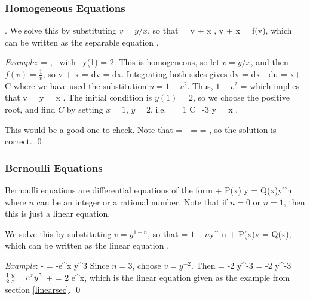 \documentclass[12pt]{book}
\begin{document}
\subsubsection{Homogeneous Equations}
\be
{}.
\ee
We solve this by substituting $v=y/x$, so that
\bee
{} = v + x ,
\quad \implies \quad
v + x  = f(v),
\eee
which can be written as the separable equation
\bee
{}.
\eee

\noindent \emph{Example}:
\bee
{} = , \mbox{ with } y(1) = 2.
\eee
This is homogeneous, so let $v=y/x$, and then $f(v) = \frac{1}{v}$, so
\bee
v + x  = 
\quad \implies \quad
{} dv = dx.
\eee
Integrating both sides gives
\bee
\int {}dv = \int {} dx
\quad \implies \quad
- \int {}du = \ln x+ \ln C
\eee
where we have used the substitution $u = 1-v^2$. Thus,
\bee
\ln\(1-v^2 \) = \ln {}
\eee
which implies that
\bee
v = \pm {}
\quad \implies \quad
y = \pm x .
\eee
The initial condition is $y(1)=2$, so we choose the positive root, and
find $C$ by setting $x=1$, $y=2$, i.e.\
 = 1 \times {}
\quad \implies \quad
C=-3
\quad \implies \quad
y = x .
\eee

This would be a good one to check. Note that
\bee
{} =  - 
= \frac{1}{\sqrt{1+\frac{3}{x^2}}}
= ,
\eee
so the solution is correct. \qed

\subsubsection{Bernoulli Equations}
Bernoulli equations are differential equations of the form
\bee
{} + P(x) y = Q(x)y^n
\eee
where $n$ can be an integer or a rational number. Note that if
$n=0$ or $n=1$, then this is just a linear equation.

We solve this by substituting $v=y^{1-n}$, so that
\bee
{} = \(1-n\)y^{-n}
\quad \implies \quad
{}  + P(x)v = Q(x),
\eee
which can be written as the linear equation
\be
{}.
\ee

\noindent\emph{Example}:
\bee
{} -\half {} = -e^x y^3
\eee
Since $n=3$, choose $v=y^{-2}$. Then
\bee
{} = -2 y^{-3} 
\quad \implies \quad
{} = -2 y^{-3}\( \half \frac{y}{x}  - e^x y^3\)
\quad \implies \quad
{} +  = 2 e^x,
\eee
which is the linear equation given as the example from section \ref{linearsec}.
\qed
\end{document}
